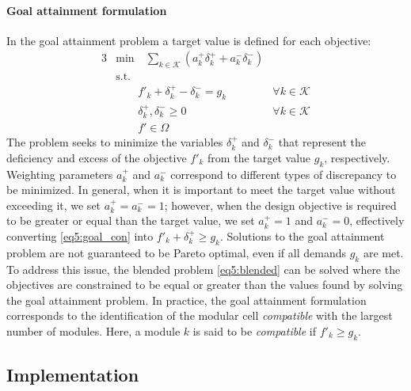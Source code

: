 \paragraph{Goal attainment formulation}
In the goal attainment problem a target value is defined for each objective:
\begin{alignat}{3}
& \underset{}{\text{min}}
\quad \sum_{k \in \mathcal{K}} (a_k^+ \delta_k^+ + a_k^-  \delta_k^-) \label{eq5:goal_obj} \\
\nonumber & \text{s.t. }  \qquad \\
& \qquad f'_k + \delta_k^+ - \delta_k^- = g_k & \forall k \in \mathcal{K} \label{eq5:goal_con}\\
&  \qquad \delta_k^+ , \delta_k^- \ge 0 & \forall k \in \mathcal{K} \\
& \qquad f' \in \Omega
\end{alignat}
The problem seeks to minimize the variables $\delta_k^+$ and $\delta_k^-$ that represent the deficiency and excess of the objective $f'_k$ from the target value $g_k$, respectively. Weighting parameters $a_k^+$ and $a_k^-$ correspond to different types of discrepancy to be minimized. In general, when it is important to meet the target value without exceeding it, we set $a_k^+ = a_k^- = 1$; however, when the design objective is required to be greater or equal than the target value, we set $a_k^+=1$ and $a_k^-=0$, effectively converting \eqref{eq5:goal_con} into $f'_k + \delta_k^+ \ge g_k$. Solutions to the goal attainment problem are not guaranteed to be Pareto optimal, even if all demands $g_k$ are met. To address this issue, the blended problem \eqref{eq5:blended} can be solved where the objectives are constrained to be equal or greater than the values found by solving the goal attainment problem. In practice, the goal attainment formulation corresponds to the identification of the modular cell \emph{compatible} with the largest number of modules. Here, a module $k$ is said to be \emph{compatible} if $f'_k \ge g_k$.


\subsection{Implementation}
